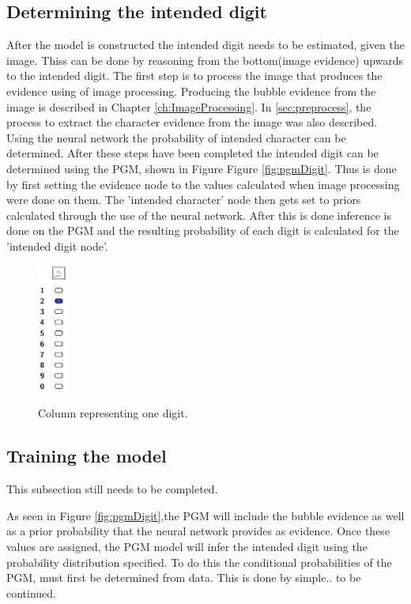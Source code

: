 \subsection{Determining the intended digit}
After the model is constructed the intended digit needs to be estimated, given the image. Thiss can be done by reasoning from the bottom(image evidence) upwards to the intended digit. The first step is to process the image that produces the evidence using of image processing. Producing the bubble evidence from the image is described in Chapter \ref{ch:ImageProcessing}. In \ref{sec:preprocess}, the process to extract the character evidence from the image was also described. Using the neural network the probability of intended character can be determined. After these steps have been completed the intended digit can be determined using the PGM, shown in Figure Figure \ref{fig:pgmDigit}. Thus is done by first setting the evidence node to the values calculated when image processing were done on them. The 'intended character' node then gets set to priors calculated through the use of the neural network. After this is done inference is done on the PGM and the resulting probability of each digit is calculated for the 'intended digit node'.

\begin{figure}
  \centering
  \includegraphics[width=1cm]{column}\\
  \caption{Column representing one digit.}
  \label{fig:column}
\end{figure}

\subsection{Training the model}

This subsection still needs to be completed.

As seen in Figure \ref{fig:pgmDigit},the PGM will include the bubble evidence as well as a prior probability that the neural network provides as evidence. Once these values are assigned, the PGM model will infer the intended digit using the probability distribution specified. To do this the conditional probabilities of the PGM, must first be determined from data. This is done by simple.. to be continued.


